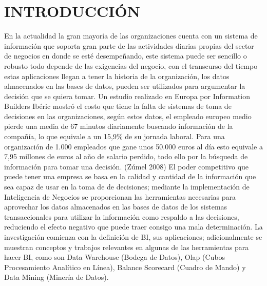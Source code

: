 \section{INTRODUCCIÓN} 
\begin{flushleft}
En la actualidad la gran mayoría de las organizaciones cuenta con un sistema de información que soporta gran parte de las actividades diarias propias del sector de negocios en donde se esté desempeñando, este sistema puede ser sencillo o robusto todo depende de las exigencias del negocio, con el transcurso del tiempo estas aplicaciones llegan a tener la historia de la organización, los datos almacenados en las bases de datos, pueden ser utilizados para argumentar la decisión que se quiera tomar. 
Un estudio realizado en Europa por Information Builders Ibéric mostró el costo que tiene la falta de sistemas de toma de decisiones en las organizaciones, según estos datos, el empleado europeo medio pierde una media de 67 minutos diariamente buscando información de la compañía, lo que equivale a un 15,9\% de su jornada laboral. Para una organización de 1.000 empleados que gane unos 50.000 euros al día esto equivale a 7,95 millones de euros al año de salario perdido, todo ello por la búsqueda de información para tomar una decisión. (Zúmel 2008)
El poder competitivo que puede tener una empresa se basa en la calidad y cantidad de la información que sea capaz de usar en la toma de de decisiones; mediante la implementación de Inteligencia de Negocios se proporcionan las herramientas necesarias para aprovechar los datos almacenados en las bases de datos de los sistemas transaccionales para utilizar la información como respaldo a las decisiones, reduciendo el efecto negativo que puede traer consigo una mala determinación. 
La investigación comienza con la definición de BI, sus aplicaciones; adicionalmente se muestran conceptos y trabajos relevantes en algunas de las herramientas para hacer BI, como son Data Warehouse (Bodega de Datos), Olap (Cubos Procesamiento Analítico en Línea), Balance Scorecard (Cuadro de Mando) y Data Mining (Minería de Datos).






\textbf{}\\
\textbf{}\\
\textbf{}\\






 

\end{flushleft}